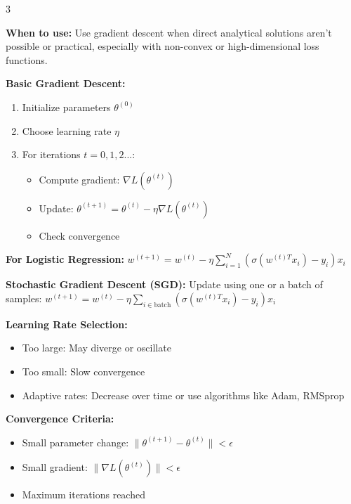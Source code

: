 \documentclass[10pt,landscape]{article}
\begin{document}
\begin{multicols}{3}
\begin{tcolorbox}[breakable, title=2.4 Gradient Descent Implementation, colback=classification]
\textbf{When to use:} Use gradient descent when direct analytical solutions aren't possible or practical, especially with non-convex or high-dimensional loss functions.

\textbf{Basic Gradient Descent:}
\begin{enumerate}[leftmargin=*,noitemsep,topsep=0pt]
    \item Initialize parameters $\theta^{(0)}$
    \item Choose learning rate $\eta$
    \item For iterations $t=0,1,2...$:
    \begin{itemize}[leftmargin=*,noitemsep]
        \item Compute gradient: $\nabla L(\theta^{(t)})$
        \item Update: $\theta^{(t+1)} = \theta^{(t)} - \eta \nabla L(\theta^{(t)})$
        \item Check convergence
    \end{itemize}
\end{enumerate}

\textbf{For Logistic Regression:}
$w^{(t+1)} = w^{(t)} - \eta \sum_{i=1}^{N}(\sigma(w^{(t)T}x_i) - y_i)x_i$

\textbf{Stochastic Gradient Descent (SGD):}
Update using one or a batch of samples:
$w^{(t+1)} = w^{(t)} - \eta \sum_{i \in \text{batch}}(\sigma(w^{(t)T}x_i) - y_i)x_i$

\textbf{Learning Rate Selection:}
\begin{itemize}[leftmargin=*,noitemsep,topsep=0pt]
    \item Too large: May diverge or oscillate
    \item Too small: Slow convergence
    \item Adaptive rates: Decrease over time or use algorithms like Adam, RMSprop
\end{itemize}

\textbf{Convergence Criteria:}
\begin{itemize}[leftmargin=*,noitemsep,topsep=0pt]
    \item Small parameter change: $\|\theta^{(t+1)} - \theta^{(t)}\| < \epsilon$
    \item Small gradient: $\|\nabla L(\theta^{(t)})\| < \epsilon$
    \item Maximum iterations reached
\end{itemize}
\end{tcolorbox}


\end{multicols}
\end{document}
